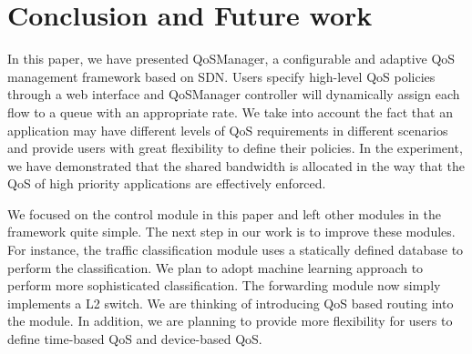 \section{Conclusion and Future work}
\label{sect:future}

In this paper, we have presented QoSManager, a configurable and adaptive QoS management framework
based on SDN. Users specify high-level QoS policies through a web interface and QoSManager controller
will dynamically assign each flow to a queue with an appropriate rate. We take into account the fact
that an application may have different levels of QoS requirements in different scenarios and provide
users with great flexibility to define their policies. In the experiment, we have demonstrated that
the shared bandwidth is allocated in the way that the QoS of high priority applications are effectively
enforced.

We focused on the control module in this paper and left other modules in the framework quite simple.
The next step in our work is to improve these modules. For instance, the traffic classification module
uses a statically defined database to perform the classification. We plan to adopt machine learning
approach  to perform more sophisticated classification. The forwarding module now simply implements a L2
switch. We are thinking of introducing QoS based routing \cite{Apostolopoulos_SIGCOMM98, Egilmez_ASPIPA12}
into the module. In addition, we are planning to provide more flexibility for users to define time-based
QoS and device-based QoS.

